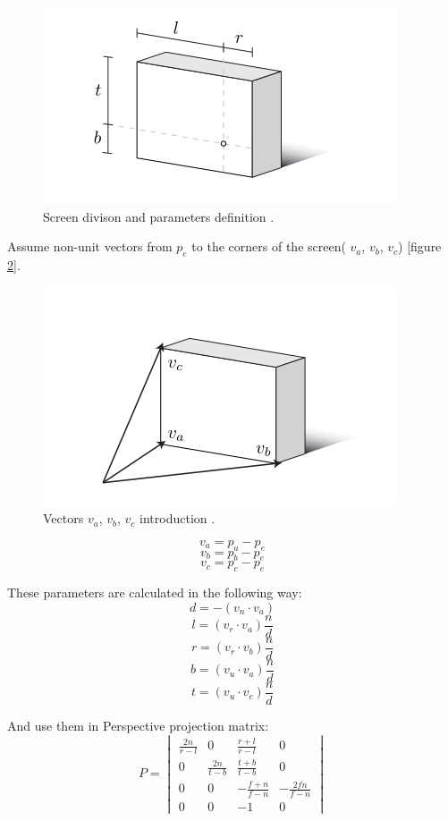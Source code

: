 \documentclass[a4paper]{report}
\begin{document}
\begin{figure}[H]
\centering
    \includegraphics[width=.6\textwidth, keepaspectratio]{images/Scemas/screen_space_distance.png}
    \caption{Screen divison and parameters definition \cite{offaxisKooima}.
    \label{fig:offaxis_3}}
 
\end{figure}

 Assume non-unit vectors from $p_e$ to the corners of the screen( $v_a$, $v_b$, $v_c$) [figure \ref{fig:offaxis_4}].

\begin{figure}[H]
\centering
  \includegraphics[width=.6\textwidth, keepaspectratio]{images/Scemas/va_vb_vc.png}
  \caption{Vectors $v_a$, $v_b$, $v_c$ introduction \cite{offaxisKooima}.  
  \label{fig:offaxis_4}}
\end{figure}

        \[v_a = p_a - p_e\]
        \[v_b = p_b - p_e\]
        \[v_c = p_c - p_e\]
        
        These parameters are calculated in the following way:
        \[d = -(v_n \cdot v_a)\]
        \[l = (v_r \cdot v_a) \frac{n}{d}\]
        \[r = (v_r \cdot v_b) \frac{n}{d}\]
        \[b = (v_u \cdot v_a) \frac{n}{d}\]
        \[t = (v_u \cdot v_c) \frac{n}{d}\]
        
        And use them in Perspective projection matrix\cite[p.~4]{offaxisKooima}:
        \[ P =
        \begin{vmatrix}
            \frac{2n}{r-l}  & 0              & \frac{r+l}{r-l}  & 0                 \\
            0               & \frac{2n}{t-b} & \frac{t+b}{t-b}  & 0                 \\
            0               & 0              & -\frac{f+n}{f-n} & -\frac{2fn}{f-n}  \\
            0               & 0              & -1               & 0
        \end{vmatrix}
        \]
\end{document}
